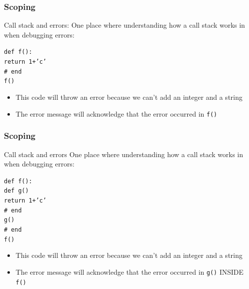 \documentclass{beamer}
\newcommand{\code}[1]{\texttt{#1}}
\newcommand{\tab}{\hspace*{22pt}}
\begin{document}
\begin{frame}%
	\frametitle{Scoping}
	
	\begin{block}{Call stack and errors:}
		One place where understanding how a call stack works in when debugging errors:
		
		\vspace{15pt}
		
			\code{def f():\\
			\tab return 1+'c' \\
			\# end \\
			f()
			}
		\endminipage\hfill
			\begin{itemize}
				\item This code will throw an error because we can't add an integer and a string
				\item The error message will acknowledge that the error occurred in \code{f()}
			\end{itemize}
		\endminipage\hfill
	\end{block}
	
\end{frame}

\begin{frame}%
	\frametitle{Scoping}
	
	\begin{block}{Call stack and errors}
		One place where understanding how a call stack works in when debugging errors:
		
		\vspace{15pt}
			\code{def f():\\
			\tab def g() \\
			\tab \tab return 1+'c' \\
			\tab \#  end \\
			\tab g() \\
			\# end \\
			f()
			}
		\endminipage\hfill
			\begin{itemize}
				\item This code will throw an error because we can't add an integer and a string
				\item The error message will acknowledge that the error occurred in \code{g()} INSIDE \code{f()}
			\end{itemize}
		\endminipage\hfill
	\end{block}
	
\end{frame}
\end{document}
